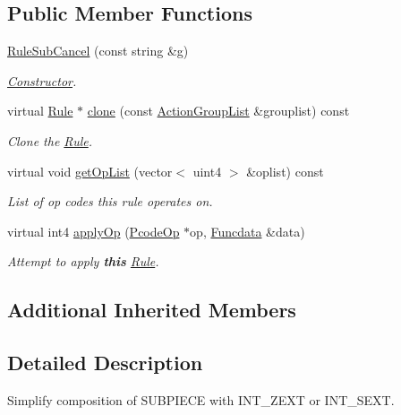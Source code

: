 \subsection*{Public Member Functions}
\begin{DoxyCompactItemize}
\item 
\mbox{\hyperlink{class_rule_sub_cancel_a73d926dd90c09be7af20966a24c96207}{Rule\+Sub\+Cancel}} (const string \&g)
\begin{DoxyCompactList}\small\item\em \mbox{\hyperlink{class_constructor}{Constructor}}. \end{DoxyCompactList}\item 
virtual \mbox{\hyperlink{class_rule}{Rule}} $\ast$ \mbox{\hyperlink{class_rule_sub_cancel_adbb51485c127c76269041401f7d0494e}{clone}} (const \mbox{\hyperlink{class_action_group_list}{Action\+Group\+List}} \&grouplist) const
\begin{DoxyCompactList}\small\item\em Clone the \mbox{\hyperlink{class_rule}{Rule}}. \end{DoxyCompactList}\item 
virtual void \mbox{\hyperlink{class_rule_sub_cancel_adaf85cfc886a338f822f794788f54bfe}{get\+Op\+List}} (vector$<$ uint4 $>$ \&oplist) const
\begin{DoxyCompactList}\small\item\em List of op codes this rule operates on. \end{DoxyCompactList}\item 
virtual int4 \mbox{\hyperlink{class_rule_sub_cancel_afa2cbf94629eeff1cdd4ae0b02ef7821}{apply\+Op}} (\mbox{\hyperlink{class_pcode_op}{Pcode\+Op}} $\ast$op, \mbox{\hyperlink{class_funcdata}{Funcdata}} \&data)
\begin{DoxyCompactList}\small\item\em Attempt to apply {\bfseries{this}} \mbox{\hyperlink{class_rule}{Rule}}. \end{DoxyCompactList}\end{DoxyCompactItemize}
\subsection*{Additional Inherited Members}


\subsection{Detailed Description}
Simplify composition of S\+U\+B\+P\+I\+E\+CE with I\+N\+T\+\_\+\+Z\+E\+XT or I\+N\+T\+\_\+\+S\+E\+XT. 

